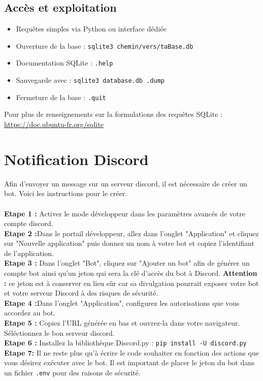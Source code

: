 \documentclass[a4paper,11pt]{article}
\begin{document}
	\subsection{Accès et exploitation}
	\begin{itemize}
		\item Requêtes simples via Python ou interface dédiée
		\item Ouverture de la base : \texttt{sqlite3 chemin/vers/taBase.db}
		\item Documentation SQLite : \texttt{.help}
		\item Sauvegarde avec : \texttt{sqlite3 database.db .dump}
		\item Fermeture de la base :  \texttt{.quit}\\
	\end{itemize}
	
	Pour plus de renseignements sur la formulations des requêtes SQLite : 
	\url{https://doc.ubuntu-fr.org/sqlite} 
	
	\section{Notification Discord}
	Afin d'envoyer un message sur un serveur discord, il est nécessaire de créer un bot. Voici les instructions pour le créer.\\\\
	\textbf{Etape 1 :} Activer le mode développeur dans les paramètres avancés de votre compte discord.\\
	\textbf{Etape 2 :}Dans le portail développeur, allez dans l'onglet "Application" et cliquez sur "Nouvelle application" puis donnez un nom à votre bot et copiez l'identifiant de l'application.\\
	\textbf{Etape 3 :} Dans l'onglet "Bot", cliquez sur "Ajouter un bot" afin de générer un compte bot ainsi qu'un jeton qui sera la clé d'accès du bot à Discord. \textbf{Attention :} ce jeton est à conserver en lieu sûr car sa divulgation pourrait exposer votre bot et votre serveur Discord à des risques de sécurité.\\
	\textbf{Etape 4 :}Dans l'onglet "Application", configurez les autorisations que vous accordez au bot.\\
	\textbf{Etape 5 :} Copiez l’URL générée en bas et ouvrez-la dans votre navigateur. Séléctionnez le bon serveur discord.\\
	\textbf{Etape 6 :} Installez la bibliothèque Discord.py : \texttt{pip install -U discord.py
	}\\
	\textbf{Etape 7:} Il ne reste plus qu'à écrire le code souhaiter en fonction des actions que vous désirez exécuter avec le bot. Il est important de placer le jeton du bot dans un fichier \texttt{.env} pour des raisons de sécurité.\\
	
\end{document}
